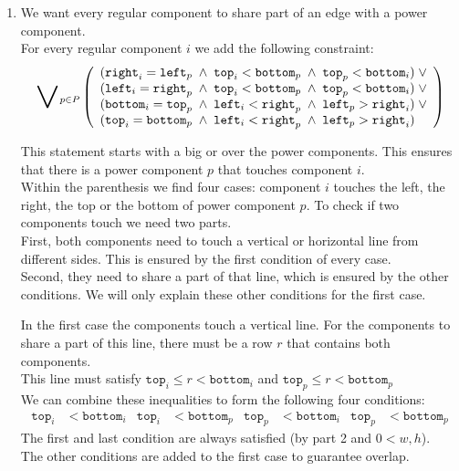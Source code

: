 \documentclass{scrartcl}
\begin{document}
\begin{enumerate}
	\item 
	We want every regular component to share part of an edge with a power component.\\
	For every regular component $i$ we add the following constraint:
	\begin{align*}
		\scalerel*{\lor}{\sum}_{p\in P}\left(
		\begin{array}{l}
			(\mathtt{right}_i = \mathtt{left}_p \;\land\; \mathtt{top}_i < \mathtt{bottom}_p \;\land\; \mathtt{top}_p < \mathtt{bottom}_i)\;\lor\\
			(\mathtt{left}_i = \mathtt{right}_p \;\land\; \mathtt{top}_i < \mathtt{bottom}_p \;\land\; \mathtt{top}_p < \mathtt{bottom}_i)\;\lor\\
			(\mathtt{bottom}_i = \mathtt{top}_p \;\land\; \mathtt{left}_i < \mathtt{right}_p \;\land\; \mathtt{left}_p > \mathtt{right}_i)\;\lor\\
			(\mathtt{top}_i = \mathtt{bottom}_p \;\land\; \mathtt{left}_i < \mathtt{right}_p \;\land\; \mathtt{left}_p > \mathtt{right}_i)
		\end{array}
		\right)
	\end{align*}

	This statement starts with a big or over the power components. This ensures that there is a power component $p$ that touches component $i$.\\
	Within the parenthesis we find four cases: component $i$ touches the left, the right, the top or the bottom of power component $p$.
	To check if two components touch we need two parts.\\
	First, both components need to touch a vertical or horizontal line from different sides. This is ensured by the first condition of every case.\\
	Second, they need to share a part of that line, which is ensured by the other conditions.
	We will only explain these other conditions for the first case.

	In the first case the components touch a vertical line.
	For the components to share a part of this line, there must be a row $r$ that contains both components.\\
	This line must satisfy $\mathtt{top}_i \leq r < \mathtt{bottom}_i$ and $\mathtt{top}_p \leq r < \mathtt{bottom}_p$\\
	We can combine these inequalities to form the following four conditions:
	\begin{align*}
		\mathtt{top}_i &< \mathtt{bottom}_i &\mathtt{top}_i &< \mathtt{bottom}_p & \mathtt{top}_p &< \mathtt{bottom}_i &\mathtt{top}_p &< \mathtt{bottom}_p
	\end{align*}
	The first and last condition are always satisfied (by part 2 and $0<w,h$).\\
	The other conditions are added to the first case to guarantee overlap.
	

\end{enumerate}
\end{document}
